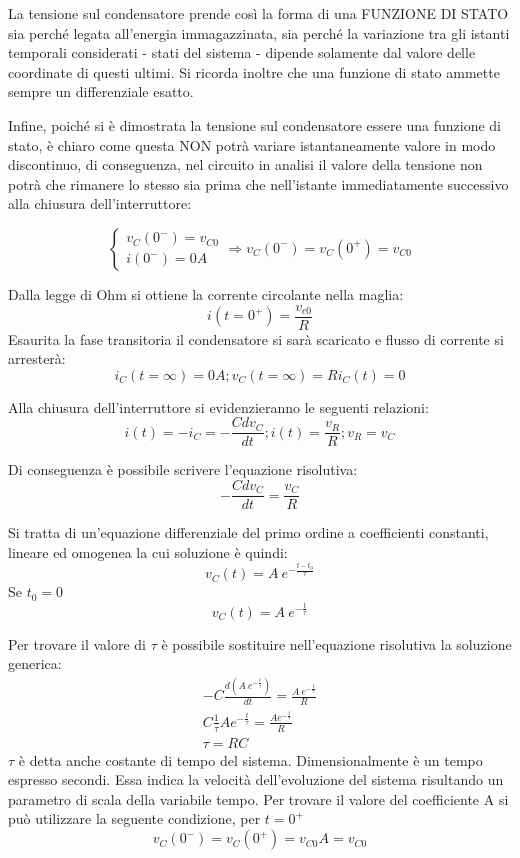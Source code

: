 \documentclass[a4paper, 12pt, twoside]{report}
\begin{document}
La tensione sul condensatore prende così la forma di una FUNZIONE DI STATO sia perché legata all’energia immagazzinata, sia perché la variazione tra gli istanti temporali considerati - stati del sistema - dipende solamente dal valore delle coordinate di questi ultimi. Si ricorda inoltre che una funzione di stato ammette sempre un differenziale esatto. {

Infine, poiché si è dimostrata la tensione sul condensatore essere una funzione di stato, è chiaro come questa NON potrà variare istantaneamente valore in modo discontinuo, di conseguenza, nel circuito in analisi il valore della tensione non potrà che rimanere lo stesso sia prima che nell’istante immediatamente successivo alla chiusura dell’interruttore:
 
 \[
 	\begin{cases}
v_C (0^-)=v_{C0} \\
i(0^- )=0A
 	\end{cases}
\Rightarrow v_C (0^-)=v_C (0^+)=v_{C0}
 \]

Dalla legge di Ohm si ottiene la corrente circolante nella maglia:
\[
i\left(t=0^+\right)=\frac{v_{c0}}{R}
\]
Esaurita la fase transitoria il condensatore si sarà scaricato e flusso di corrente si arresterà:
\[
i_C\left(t=\infty\right)=0A;v_C\left(t=\infty\right)=Ri_C\left(t\right)=0
\]

Alla chiusura dell’interruttore si evidenzieranno le seguenti relazioni:
\[
i\left(t\right)=-i_C=-\frac{Cdv_C}{dt};i\left(t\right)=\frac{v_R}{R};v_R=v_C
\]

Di conseguenza è possibile scrivere l’equazione risolutiva:
\begin{equation}
-\frac{Cdv_C}{dt}=\frac{v_C}{R}
\end{equation}

Si tratta di un’equazione differenziale del primo ordine a coefficienti constanti, lineare ed omogenea la cui soluzione è quindi:
\[
v_C\left(t\right)=A\ e^{-\frac{t-t_0}{\tau}}
\]
Se $t_0=0$
\begin{equation}
v_C\left(t\right)=A\ e^{-\frac{t}{\tau}}
\end{equation}


Per trovare il valore di $\tau$ è possibile sostituire nell’equazione risolutiva la soluzione generica:
\[
	\begin{split}
-C\frac{d\left(A\ e^{-\frac{t}{\tau}}\right)}{dt}=\frac{A\ e^{-\frac{t}{\tau}}}{R}\\
C\frac{1}{\tau}Ae^{-\frac{t}{\tau}}=\frac{Ae^{-\frac{t}{\tau}}}{R}\\
\tau=RC
\end{split}
\]
$\tau$ è detta anche costante di tempo del sistema. Dimensionalmente è un tempo espresso secondi. Essa indica la velocità dell’evoluzione del sistema risultando un parametro di scala della variabile tempo.
Per trovare il valore del coefficiente A si può utilizzare la seguente condizione, per $t=0^+$
\[
v_C\left(0^-\right)=v_C\left(0^+\right)=v_{C0}
A=v_{C0}
\]

}
\end{document}
